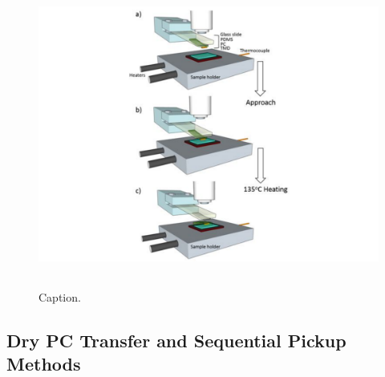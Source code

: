 \begin{figure}[ht]
    \centering
    \includegraphics[height=10cm,width=14cm]{pickup_schematic}
    \caption[Schematic and process used for pickup transfers]
    {
        Caption.
    }
    \label{fig:pickup_schematic}
\end{figure}

\subsection{Dry PC Transfer and Sequential Pickup Methods}\label{subsec:dry_pc_transfer}




